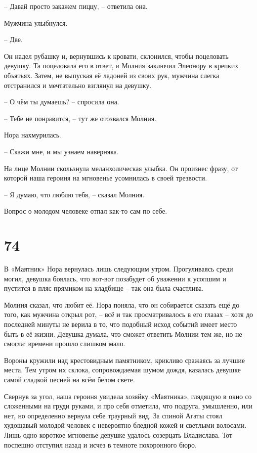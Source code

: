 \documentclass[
  a5paperpaper,
  DIV=11,
  numbers=noendperiod]{scrreprt}
\begin{document}
-- Давай просто закажем пиццу, -- ответила она.

Мужчина улыбнулся.

-- Две.

Он надел рубашку и, вернувшись к кровати, склонился, чтобы поцеловать
девушку. Та поцеловала его в ответ, и Молния заключил Элеонору в крепких
объятьях. Затем, не выпуская её ладоней из своих рук, мужчина слегка
отстранился и мечтательно взглянул на девушку.

-- О чём ты думаешь? -- спросила она.

-- Тебе не понравится, -- тут же отозвался Молния.

Нора нахмурилась.

-- Скажи мне, и мы узнаем наверняка.

На лице Молнии скользнула меланхолическая улыбка. Он произнес фразу, от
которой наша героиня на мгновенье усомнилась в своей трезвости.

-- Я думаю, что люблю тебя, -- сказал Молния.

Вопрос о молодом человеке отпал как-то сам по себе.

\section*{74}\label{74}


В «Маятник» Нора вернулась лишь следующим утром. Прогуливаясь среди
могил, девушка боялась, что вот-вот позабудет об уважении к усопшим и
пустится в пляс прямиком на кладбище -- так она была счастлива.

Молния сказал, что любит её. Нора поняла, что он собирается сказать ещё
до того, как мужчина открыл рот, -- всё и так просматривалось в его
глазах -- хотя до последней минуты не верила в то, что подобный исход
событий имеет место быть в её жизни. Девушка думала, что сможет ответить
Молнии тем же, но не смогла: времени прошло слишком мало.

Вороны кружили над крестовидным памятником, крикливо сражаясь за лучшие
места. Тем утром их склока, сопровождаемая шумом дождя, казалась девушке
самой сладкой песней на всём белом свете.

Свернув за угол, наша героиня увидела хозяйку «Маятника», глядящую в
окно со сложенными на груди руками, и про себя отметила, что подруга,
умышленно, или нет, но определенно вернула себе траурный вид. За спиной
Агаты стоял худощавый молодой человек с невероятно бледной кожей и
светлыми волосами. Лишь одно короткое мгновенье девушке удалось
созерцать Владислава. Тот поспешно отступил назад и исчез в темноте
похоронного бюро.
\end{document}
